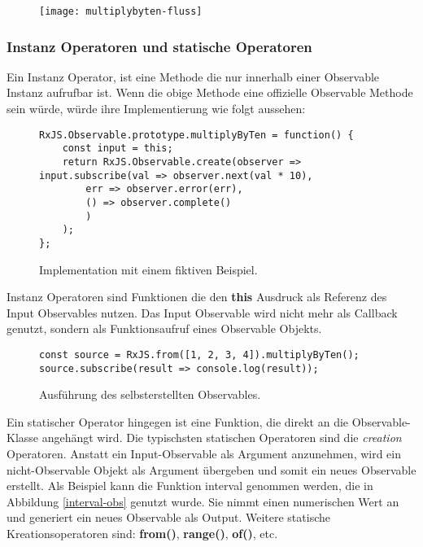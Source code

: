 \begin{figure}[H]
\centering
\texttt{[image: multiplybyten-fluss]}
\end{figure}

\subsubsection{Instanz Operatoren und statische Operatoren}
Ein Instanz Operator, ist eine Methode die nur innerhalb einer Observable Instanz aufrufbar ist. Wenn die obige Methode eine offizielle Observable Methode sein würde, würde ihre Implementierung wie folgt aussehen:

\begin{figure}[H]
\begin{lstlisting}[basicstyle=\small]
RxJS.Observable.prototype.multiplyByTen = function() {
    const input = this;
    return RxJS.Observable.create(observer => input.subscribe(val => observer.next(val * 10),
        err => observer.error(err),
        () => observer.complete()
        )
    );
};
\end{lstlisting}
\caption{Implementation mit einem fiktiven Beispiel.}
\end{figure}

\noindent
Instanz Operatoren sind Funktionen die den \textbf{this} Ausdruck als Referenz des Input Observables nutzen. Das Input Observable wird nicht mehr als Callback genutzt, sondern als Funktionsaufruf eines Observable Objekts.

\begin{figure}[H]
\begin{lstlisting}[basicstyle=\small]
const source = RxJS.from([1, 2, 3, 4]).multiplyByTen();
source.subscribe(result => console.log(result));
\end{lstlisting}
\caption{Ausführung des selbsterstellten Observables.}
\end{figure}

\noindent
Ein statischer Operator hingegen ist eine Funktion, die direkt an die Observable-Klasse angehängt wird. Die typischsten statischen Operatoren sind die \textit{creation} Operatoren. Anstatt ein Input-Observable als Argument anzunehmen, wird ein nicht-Observable Objekt als Argument übergeben und somit ein neues Observable erstellt. Als Beispiel kann die Funktion interval genommen werden, die in Abbildung \ref{interval-obs} genutzt wurde. Sie nimmt einen numerischen Wert an und generiert ein neues Observable als Output. Weitere statische Kreationsoperatoren sind: \textbf{from()}, \textbf{range()}, \textbf{of()}, etc.

